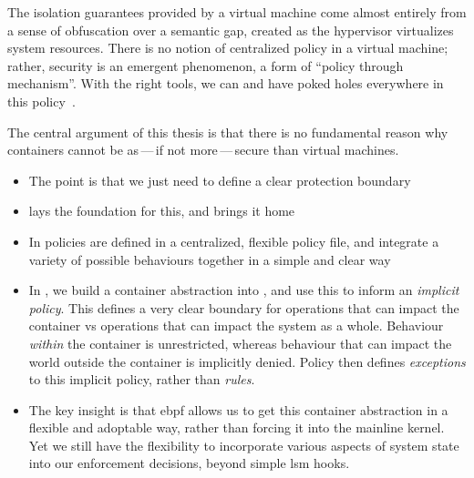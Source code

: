 The isolation guarantees provided by a virtual machine come almost entirely from a sense
of obfuscation over a semantic gap, created as the hypervisor virtualizes system
resources.  There is no notion of centralized policy in a virtual machine; rather,
security is an emergent phenomenon, a form of \enquote{policy through mechanism}. With the
right tools, we can and have poked holes everywhere in this
policy~\cite{dubrelle2015_hypervisor, thongthua2016_analysis, shahzad2017_systematic}.

The central argument of this thesis is that there is no fundamental reason why containers
cannot be as\,---\,if not more\,---\,secure than virtual machines.
\begin{inprogress}
  \begin{itemize}
    \item The point is that we just need to define a clear protection boundary
    \item \bpfbox{} lays the foundation for this, and \bpfcontain{} brings it home
    \item In \bpfbox{} policies are defined in a centralized, flexible policy file, and
          integrate a variety of possible behaviours together in a simple and clear way
    \item In \bpfcontain{}, we build a container abstraction into \bpfbox{}, and use this
          to inform an \textit{implicit policy}. This defines a very clear boundary for
          operations that can impact the container vs operations that can impact the system as
          a whole. Behaviour \textit{within} the container is unrestricted, whereas behaviour
          that can impact the world outside the container is implicitly denied. Policy then
          defines \textit{exceptions} to this implicit policy, rather than \textit{rules}.
    \item The key insight is that \gls{ebpf} allows us to get this container abstraction
          in a flexible and adoptable way, rather than forcing it into the mainline kernel.
          Yet we still have the flexibility to incorporate various aspects of system state
          into our enforcement decisions, beyond simple \gls{lsm} hooks.
  \end{itemize}
\end{inprogress}

